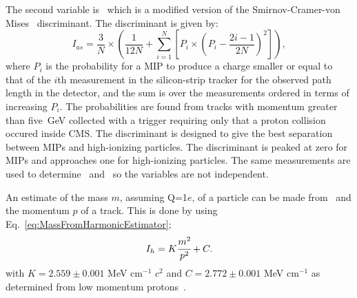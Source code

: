 The second variable is \ias\ which is a modified version of the Smirnov-Cramer-von Mises~\cite{Eadie, James} discriminant.
The discriminant is given by:
\begin{equation}
 I_{as} = \frac{3}{N} \times \left(
   \frac{1}{12N} + \sum_{i=1}^N
   \left[
   P_i \times \left( P_i - \frac{2i-1}{2N} \right)^2 \right] \right),
\end{equation}
where $P_i$ is the probability for a MIP to
produce a charge smaller or equal to that of the $i$th measurement in the silicon-strip tracker
for the observed path length in the detector, and the sum is over the
measurements ordered in terms of increasing $P_i$. The probabilities are found from tracks with momentum greater than five~GeV collected with a trigger requiring only
that a proton collision occured inside CMS. The discriminant is designed to give the best separation between MIPs and high-ionizing particles.
The discriminant is peaked at zero for MIPs and approaches one for high-ionizing particles.
The same measurements are used to determine \ih\ and \ias\ so the variables are not independent. 

An estimate of the mass $m$, assuming Q=1$e$, of a particle can be made from \ih\ and the momentum $p$ of a track. This is done by using Eq.~\ref{eq:MassFromHarmonicEstimator};
\begin{equation}
I_h= K\cfrac{m^2}{p^2}+C.
\label{eq:MassFromHarmonicEstimator}
\end{equation}
with  $K=2.559 \pm 0.001$ MeV cm$^{-1}$ $c^2$ and $C=2.772 \pm 0.001$ MeV cm$^{-1}$ as determined from low momentum protons~\cite{Khachatryan:2011ts}.

